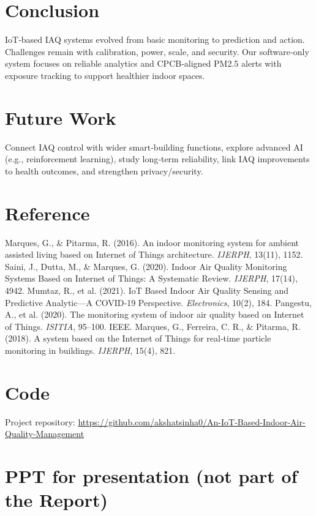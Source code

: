 \documentclass[12pt]{report}
\begin{document}
\section{Conclusion}
IoT‑based IAQ systems evolved from basic monitoring to prediction and action. Challenges remain with calibration, power, scale, and security. Our software‑only system focuses on reliable analytics and CPCB‑aligned PM2.5 alerts with exposure tracking to support healthier indoor spaces.

\section{Future Work}
Connect IAQ control with wider smart‑building functions, explore advanced AI (e.g., reinforcement learning), study long‑term reliability, link IAQ improvements to health outcomes, and strengthen privacy/security.

\section{Reference}
\begin{thebibliography}{9}
 Marques, G., \& Pitarma, R. (2016). An indoor monitoring system for ambient assisted living based on Internet of Things architecture. \emph{IJERPH}, 13(11), 1152.
 Saini, J., Dutta, M., \& Marques, G. (2020). Indoor Air Quality Monitoring Systems Based on Internet of Things: A Systematic Review. \emph{IJERPH}, 17(14), 4942.
 Mumtaz, R., et al. (2021). IoT Based Indoor Air Quality Sensing and Predictive Analytic—A COVID‑19 Perspective. \emph{Electronics}, 10(2), 184.
 Pangestu, A., et al. (2020). The monitoring system of indoor air quality based on Internet of Things. \emph{ISITIA}, 95--100. IEEE.
 Marques, G., Ferreira, C. R., \& Pitarma, R. (2018). A system based on the Internet of Things for real‑time particle monitoring in buildings. \emph{IJERPH}, 15(4), 821.
\end{thebibliography}

\section{Code}
Project repository: \url{https://github.com/akshatsinha0/An-IoT-Based-Indoor-Air-Quality-Management}

\section*{PPT for presentation (not part of the Report)}
\end{document}
